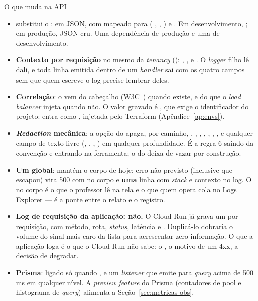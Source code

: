 \begin{especificacao}{O que muda na API}
\begin{itemize}
  \item {} substitui o :  em JSON,
    com  mapeado para  ( \seta{}
    ,  \seta{} ,  \seta{}
    ) e . Em desenvolvimento,
    ; em produção, JSON cru. Uma dependência de produção e
    uma de desenvolvimento.
  \item \textbf{Contexto por requisição} no mesmo  da
    \emph{tenancy} (): , ,
     e . O \emph{logger} filho lê dali, e toda
    linha emitida dentro de um \emph{handler} sai com os quatro campos sem
    que quem escreve o log precise lembrar deles.
  \item \textbf{Correlação}: o  vem do cabeçalho
     (W3C~\cite{w3ctracecontext}) quando existe, e do
     que o \emph{load balancer} injeta quando não.
    O valor gravado é , que exige o
    identificador do projeto: entra como , injetada
    pelo Terraform (Apêndice~\ref{ap:envs}).
  \item \textbf{\emph{Redaction} mecânica}: a opção  do 
    apaga, por caminho, , , ,
    , , , ,  e qualquer
    campo de texto livre (, , ,
    ) em qualquer profundidade. É a regra 6 saindo da
    convenção e entrando na ferramenta; o  do
     deixa de vazar por construção.
  \item \textbf{Um  global}:  mantém
    o corpo de hoje; erro não previsto (inclusive  que escapou)
    vira 500 com  no corpo e
    \textbf{uma} linha  com \emph{stack} e contexto no log. O
     no corpo é o que o professor lê na tela e o que quem
    opera cola no Logs Explorer --- é a ponte entre o relato e o registro.
  \item \textbf{Log de requisição da aplicação: não.} O Cloud Run já grava
    um por requisição, com método, rota, \emph{status}, latência e
    . Duplicá-lo dobraria o volume do sinal mais caro da lista
    para acrescentar zero informação. O que a aplicação loga é o que o
    Cloud Run não sabe: o , o motivo de um 4xx, a decisão de
    degradar.
  \item \textbf{Prisma}: 
    ligado só quando , e um \emph{listener} que emite
     para \emph{query} acima de 500\,ms em qualquer nível. A
    \emph{preview feature}  do Prisma (contadores de pool e
    histograma de \emph{query}) alimenta a Seção~\ref{sec:metricas-obs}.
\end{itemize}
\end{especificacao}

